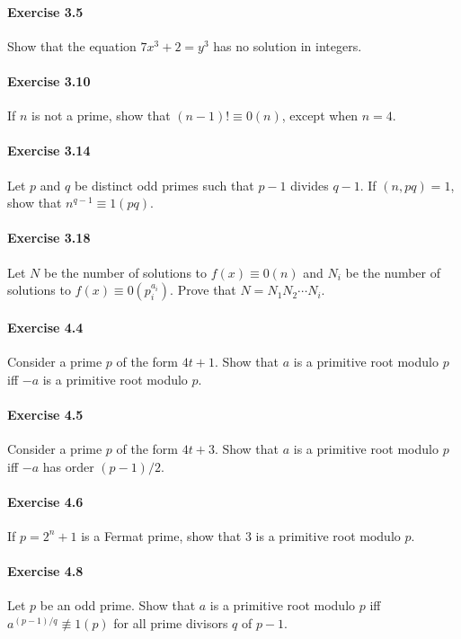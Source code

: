 \documentclass{article}
\begin{document}
\paragraph{Exercise 3.5} Show that the equation $7 x^{3}+2=y^{3}$ has no solution in integers.


\paragraph{Exercise 3.10} If $n$ is not a prime, show that $(n-1) ! \equiv 0(n)$, except when $n=4$.


\paragraph{Exercise 3.14} Let $p$ and $q$ be distinct odd primes such that $p-1$ divides $q-1$. If $(n, p q)=1$, show that $n^{q-1} \equiv 1(p q)$.


\paragraph{Exercise 3.18} Let $N$ be the number of solutions to $f(x) \equiv 0(n)$ and $N_{i}$ be the number of solutions to $f(x) \equiv 0\left(p_{i}^{a_{i}}\right)$. Prove that $N=N_{1} N_{2} \cdots N_{i}$.


\paragraph{Exercise 4.4} Consider a prime $p$ of the form $4 t+1$. Show that $a$ is a primitive root modulo $p$ iff $-a$ is a primitive root modulo $p$.


\paragraph{Exercise 4.5} Consider a prime $p$ of the form $4 t+3$. Show that $a$ is a primitive root modulo $p$ iff $-a$ has order $(p-1) / 2$.


\paragraph{Exercise 4.6} If $p=2^{n}+1$ is a Fermat prime, show that 3 is a primitive root modulo $p$.


\paragraph{Exercise 4.8} Let $p$ be an odd prime. Show that $a$ is a primitive root modulo $p$ iff $a^{(p-1) / q} \not \equiv 1(p)$ for all prime divisors $q$ of $p-1$.
\end{document}
